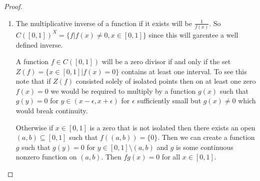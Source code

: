 \documentclass[10pt]{article}
\theoremstyle{plain}
\theoremstyle{remark}
\begin{document}
\begin{proof}
  \begin{enumerate}
  \item The multiplicative inverse of a function if it exists will be
    $\frac{1}{f(x)}$. So $C([0,1])^X=\{f|f(x)\neq 0,x\in[0,1]\}$ since this will
    garentee a well defined inverse.

    A function $f\in C([0,1])$ will be a zero divisor if and only if
    the set $Z(f)=\{x\in[0,1]|f(x)=0\}$ contains at least one interval.
    To see this note that if $Z(f)$ consisted solely of isolated points
    then on at least one zero $f(x)=0$ we would be required to multiply by a function
    $g(x)$ such that $g(y)=0$ for $y\in(x-\epsilon,x+\epsilon)$ for $\epsilon$ sufficiently small
    but $g(x)\neq 0$ which would break continuity.

    Otherwise if $x\in[0,1]$ is a zero that is not isolated then there exists
    an open $(a,b)\subseteq[0,1]$ such that $f((a,b))=\{0\}$. Then we can create a function
    $g$ such that $g(y)=0$ for $y\in[0,1]\setminus(a,b)$ and $g$ is some continuous nonzero
    function on $(a,b)$. Then $fg(x)=0$ for all $x\in [0,1]$.


\end{enumerate}
\end{proof}
\end{document}
